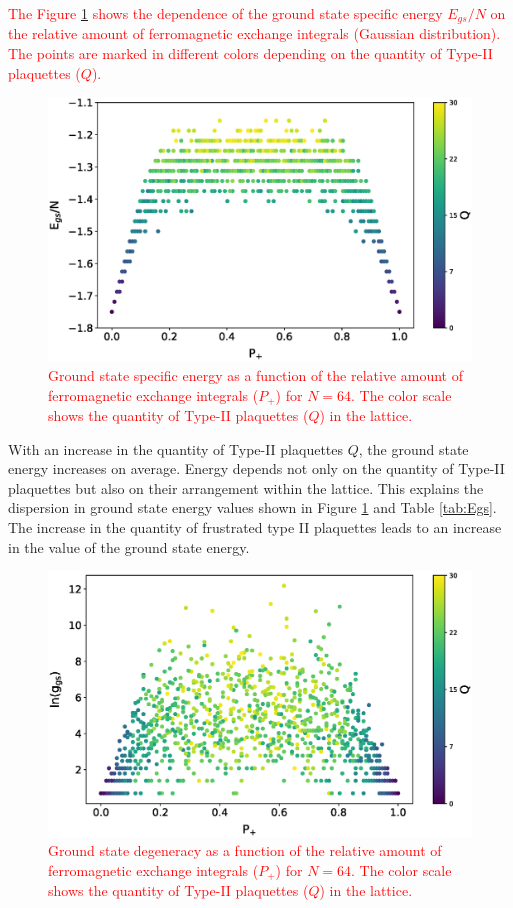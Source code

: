 \documentclass[preprint,12pt]{elsarticle}
\begin{document}
	\textcolor{red}{
		The Figure \ref{fig:E(Q)} shows the dependence of the ground state specific energy $E_{gs}/N$ on the relative amount of ferromagnetic exchange integrals (Gaussian distribution). The points are marked in different colors depending on the quantity of Type-II plaquettes ($Q$).}
	
	\begin{figure}[H]
		\centering
		\includegraphics[width=1.0\linewidth]{pictures/E_P_Q.eps}
		\caption{\textcolor{red}{Ground state specific energy as a function of the relative amount of ferromagnetic exchange integrals ($P_+$) for $N=64$. The color scale shows the quantity of Type-II plaquettes ($Q$) in the lattice.}}
		\label{fig:E(Q)}
	\end{figure}
	
	With an increase in the quantity of Type-II plaquettes $Q$, the ground state energy increases on average. Energy depends not only on the quantity of Type-II plaquettes but also on their arrangement within the lattice. This explains the dispersion in ground state energy values shown in Figure \ref{fig:E(Q)} and Table \ref{tab:Egs}. The increase in the quantity of frustrated type II plaquettes leads to an increase in the value of the ground state energy.
	
	
	\begin{figure}[H]
		\centering
		\includegraphics[width=1.0\linewidth]{pictures/lng_P_Q.eps}
		\caption{\textcolor{red}{Ground state degeneracy as a function of the relative amount of ferromagnetic exchange integrals ($P_+$) for $N=64$. The color scale shows the quantity of Type-II plaquettes ($Q$) in the lattice.}}
		\label{fig:g(Q)}
	\end{figure}
	
\end{document}
